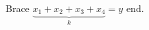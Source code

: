 \documentclass[12pt]{article}
\begin{document}
Brace $\underbrace{x_1+x_2+x_3+x_4}_{k} = y$ end.
\end{document}
